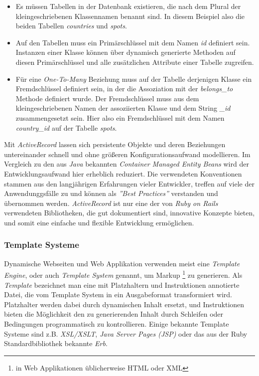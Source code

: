 \begin{itemize}
\item Es müssen Tabellen in der Datenbank existieren, die nach dem
  Plural der kleingeschriebenen Klassennamen benannt sind. In diesem
  Beispiel also die beiden Tabellen \textit{countries} und
  \textit{spots}.
\item Auf den Tabellen muss ein Primärschlüssel mit dem Namen
  \textit{id} definiert sein. Instanzen einer Klasse können über
  dynamisch generierte Methoden auf diesen Primärschlüssel und alle
  zusätzlichen Attribute einer Tabelle zugreifen.
\item Für eine \textit{One-To-Many} Beziehung muss auf der Tabelle
  derjenigen Klasse ein Fremdschlüssel definiert sein, in der die
  Assoziation mit der \textit{belongs\_to} Methode definiert
  wurde. Der Fremdschlüssel muss aus dem kleingeschriebenen Namen der
  assoziierten Klasse und dem String \textit{\_id} zusammengesetzt
  sein. Hier also ein Fremdschlüssel mit dem Namen
  \textit{country\_id} auf der Tabelle \textit{spots}.
\end{itemize}

Mit \textit{ActiveRecord} lassen sich persistente Objekte und deren
Beziehungen untereinander schnell und ohne größeren
Konfigurationsaufwand modellieren. Im Vergleich zu den aus
\textit{Java} bekannten \textit{Container Managed Entity Beans} wird
der Entwicklungsaufwand hier erheblich reduziert. Die verwendeten
Konventionen stammen aus den langjährigen Erfahrungen vieler
Entwickler, treffen auf viele der Anwendunggsfälle zu und können als
\textit{''Best Practices''} verstanden und über\-nommen
werden. \textit{ActiveRecord} ist nur eine der von \textit{Ruby on
  Rails} verwendeten Bibliotheken, die gut dokumentiert sind,
innovative Konzepte bieten, und somit eine einfache und flexible
Entwicklung ermöglichen.

\subsubsection{Template Systeme}

Dynamische Webseiten und Web Applikation verwenden meist eine
\textit{Template Engine}, oder auch \textit{Template System} genannt,
um Markup \footnote{in Web Applikationen üblicherweise HTML oder XML}
zu generieren. Als \textit{Template} bezeichnet man eine mit
Platzhaltern und Instruktionen annotierte Datei, die vom Template
System in ein Ausgabeformat transformiert wird. Platzhalter werden
dabei durch dynamischen Inhalt ersetzt, und Instruktionen bieten die
Möglichkeit den zu generierenden Inhalt durch Schleifen oder
Bedingungen programmatisch zu kontrollieren. Einige bekannte Template
Systeme sind z.B. \textit{XSL/XSLT}, \textit{Java Server Pages (JSP)}
oder das aus der Ruby Standardbibliothek bekannte \textit{Erb}.

